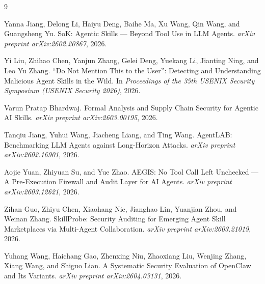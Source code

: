 \documentclass{article}
\begin{document}
\newpage
{
\small

\begin{thebibliography}{9}

Yanna Jiang, Delong Li, Haiyu Deng, Baihe Ma, Xu Wang, Qin Wang, and Guangsheng Yu.
\newblock SoK: Agentic Skills --- Beyond Tool Use in LLM Agents.
\newblock \emph{arXiv preprint arXiv:2602.20867}, 2026.

Yi Liu, Zhihao Chen, Yanjun Zhang, Gelei Deng, Yuekang Li, Jianting Ning, and Leo Yu Zhang.
\newblock ``Do Not Mention This to the User'': Detecting and Understanding Malicious Agent Skills in the Wild.
\newblock In \emph{Proceedings of the 35th USENIX Security Symposium (USENIX Security 2026)}, 2026.


Varun Pratap Bhardwaj.
\newblock Formal Analysis and Supply Chain Security for Agentic AI Skills.
\newblock \emph{arXiv preprint arXiv:2603.00195}, 2026.

Tanqiu Jiang, Yuhui Wang, Jiacheng Liang, and Ting Wang.
\newblock AgentLAB: Benchmarking LLM Agents against Long-Horizon Attacks.
\newblock \emph{arXiv preprint arXiv:2602.16901}, 2026.

Aojie Yuan, Zhiyuan Su, and Yue Zhao.
\newblock AEGIS: No Tool Call Left Unchecked --- A Pre-Execution Firewall and Audit Layer for AI Agents.
\newblock \emph{arXiv preprint arXiv:2603.12621}, 2026.

Zihan Guo, Zhiyu Chen, Xiaohang Nie, Jianghao Lin, Yuanjian Zhou, and Weinan Zhang.
\newblock SkillProbe: Security Auditing for Emerging Agent Skill Marketplaces via Multi-Agent Collaboration.
\newblock \emph{arXiv preprint arXiv:2603.21019}, 2026.

Yuhang Wang, Haichang Gao, Zhenxing Niu, Zhaoxiang Liu, Wenjing Zhang, Xiang Wang, and Shiguo Lian.
\newblock A Systematic Security Evaluation of OpenClaw and Its Variants.
\newblock \emph{arXiv preprint arXiv:2604.03131}, 2026.


\end{thebibliography}}
\end{document}
